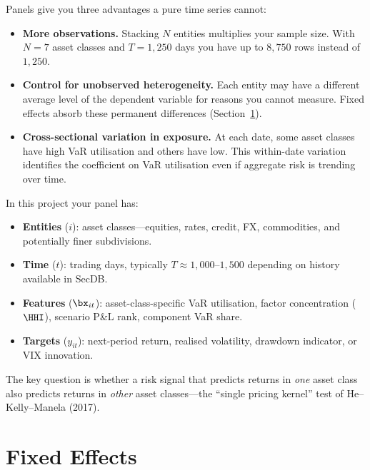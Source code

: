 Panels give you three advantages a pure time series cannot:
\begin{itemize}[leftmargin=*]
  \item \textbf{More observations.} Stacking $N$ entities multiplies your sample size. With $N = 7$ asset classes and $T = 1{,}250$ days you have up to $8{,}750$ rows instead of $1{,}250$.
  \item \textbf{Control for unobserved heterogeneity.} Each entity may have a different average level of the dependent variable for reasons you cannot measure. Fixed effects absorb these permanent differences (Section~\ref{sec:panel-fe}).
  \item \textbf{Cross-sectional variation in exposure.} At each date, some asset classes have high VaR utilisation and others have low. This within-date variation identifies the coefficient on VaR utilisation even if aggregate risk is trending over time.
\end{itemize}

\begin{prereq}
In this project your panel has:
\begin{itemize}[leftmargin=*]
  \item \textbf{Entities} ($i$): asset classes---equities, rates, credit, FX, commodities, and potentially finer subdivisions.
  \item \textbf{Time} ($t$): trading days, typically $T \approx 1{,}000$--$1{,}500$ depending on history available in SecDB.
  \item \textbf{Features} ($\bx_{it}$): asset-class-specific VaR utilisation, factor concentration ($\HHI$), scenario P\&L rank, component VaR share.
  \item \textbf{Targets} ($y_{it}$): next-period return, realised volatility, drawdown indicator, or VIX innovation.
\end{itemize}
The key question is whether a risk signal that predicts returns in \emph{one} asset class also predicts returns in \emph{other} asset classes---the ``single pricing kernel'' test of He--Kelly--Manela (2017).
\end{prereq}

\section{Fixed Effects}
\label{sec:panel-fe}


